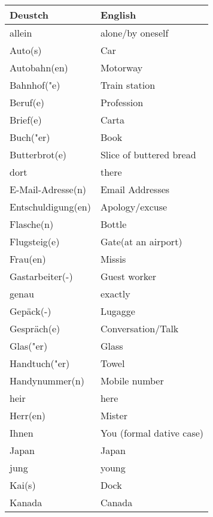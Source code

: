 \documentclass{article}
\renewcommand{\arraystretch}{1}
\begin{document}
\begin{minipage}{0.48\textwidth}
    \centering
    \renewcommand{\arraystretch}{1.5}
    \begin{tabular}{|>{\raggedright\arraybackslash}p{3.5cm}|>{\raggedright\arraybackslash}p{3.5cm}|}
        \hline
        \rowcolor{gray!20} \textbf{Deustch} & \textbf{English} \\
        \hline
        allein & alone/by oneself \\\hline
        Auto(s) & Car \\\hline
        Autobahn(en) & Motorway \\\hline
        Bahnhof("e) & Train station \\\hline
        Beruf(e) & Profession \\\hline
        Brief(e) & Carta \\\hline
        Buch("er) & Book \\\hline
        Butterbrot(e) & Slice of buttered bread \\\hline
        dort & there \\\hline
        E-Mail-Adresse(n) & Email Addresses \\\hline
        Entschuldigung(en) & Apology/excuse \\\hline
        Flasche(n) & Bottle \\\hline
        Flugsteig(e) & Gate(at an airport) \\\hline
        Frau(en) & Missis \\\hline
        Gastarbeiter(-) & Guest worker \\\hline
        genau & exactly \\\hline
        Gepäck(-) & Lugagge \\\hline
        Gespräch(e) & Conversation/Talk \\\hline
        Glas("er) & Glass \\\hline
        Handtuch("er) & Towel \\\hline
        Handynummer(n) & Mobile number \\\hline
        heir & here \\\hline
        Herr(en) & Mister \\\hline
        Ihnen & You (formal dative case) \\\hline
        Japan & Japan \\\hline
        jung & young \\\hline
        Kai(s) & Dock \\\hline
        Kanada & Canada \\\hline
    \end{tabular}
\end{minipage}%
\end{document}
